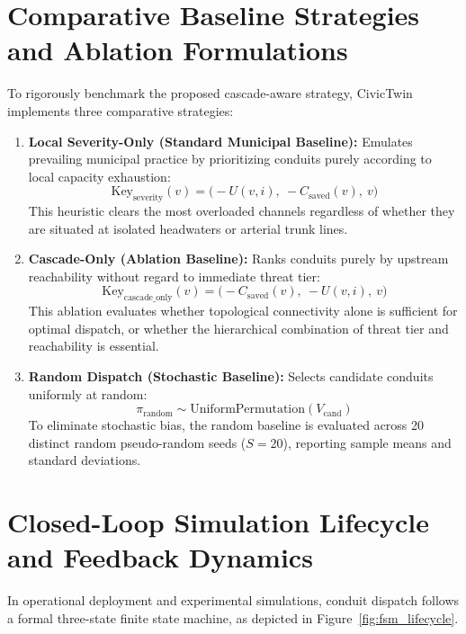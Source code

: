 \documentclass[12pt,a4paper]{report}
\begin{document}
\section{Comparative Baseline Strategies and Ablation Formulations}
To rigorously benchmark the proposed cascade-aware strategy, CivicTwin implements three comparative strategies:
\begin{enumerate}
    \item \textbf{Local Severity-Only (Standard Municipal Baseline):}
    Emulates prevailing municipal practice by prioritizing conduits purely according to local capacity exhaustion:
    \begin{equation}
    \text{Key}_{\text{severity}}(v) = \Big(-U(v, i),~ -C_{\text{saved}}(v),~ v\Big)
    \label{eqn:severity_sort_key}
    \end{equation}
    This heuristic clears the most overloaded channels regardless of whether they are situated at isolated headwaters or arterial trunk lines.
    \item \textbf{Cascade-Only (Ablation Baseline):}
    Ranks conduits purely by upstream reachability without regard to immediate threat tier:
    \begin{equation}
    \text{Key}_{\text{cascade\_only}}(v) = \Big(-C_{\text{saved}}(v),~ -U(v, i),~ v\Big)
    \label{eqn:cascade_only_key}
    \end{equation}
    This ablation evaluates whether topological connectivity alone is sufficient for optimal dispatch, or whether the hierarchical combination of threat tier and reachability is essential.
    \item \textbf{Random Dispatch (Stochastic Baseline):}
    Selects candidate conduits uniformly at random:
    \begin{equation}
    \pi_{\text{random}} \sim \text{UniformPermutation}(V_{\text{cand}})
    \end{equation}
    To eliminate stochastic bias, the random baseline is evaluated across 20 distinct random pseudo-random seeds ($S = 20$), reporting sample means and standard deviations.
\end{enumerate}

\section{Closed-Loop Simulation Lifecycle and Feedback Dynamics}
In operational deployment and experimental simulations, conduit dispatch follows a formal three-state finite state machine, as depicted in Figure~\ref{fig:fsm_lifecycle}.
\end{document}
